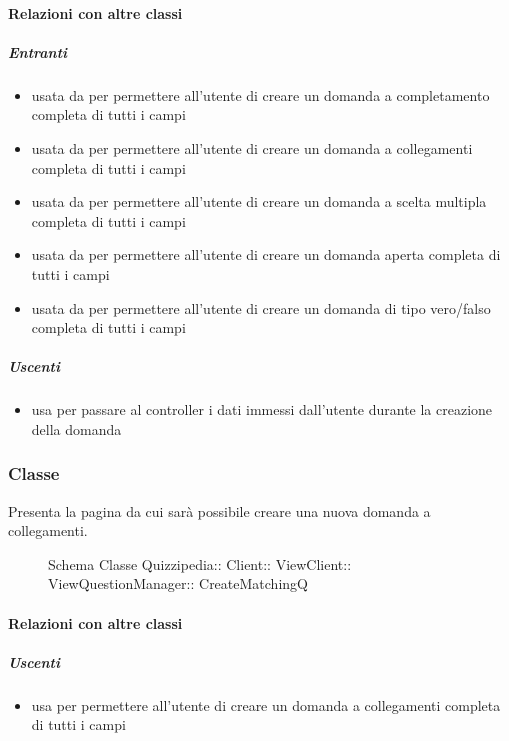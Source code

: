 \paragraph{Relazioni con altre classi}
\subparagraph{Entranti}
\begin{itemize}
\item usata da  per permettere all'utente di creare un domanda a completamento completa di tutti i campi
\item usata da  per permettere all'utente di creare un domanda a collegamenti completa di tutti i campi
\item usata da  per permettere all'utente di creare un domanda a scelta multipla completa di tutti i campi
\item usata da  per permettere all'utente di creare un domanda aperta completa di tutti i campi
\item usata da  per permettere all'utente di creare un domanda di tipo vero/falso completa di tutti i campi
\end{itemize}
\subparagraph{Uscenti}
\begin{itemize}
\item usa  per passare al controller i dati immessi dall'utente durante la creazione della domanda
\end{itemize}
\subsubsection{Classe }
Presenta la pagina da cui sarà possibile creare una nuova domanda a collegamenti.
\begin{figure}[H]
\centering
\noindent{}
\caption[Schema Classe CreateMatchingQ]{Schema Classe Quizzipedia:: Client:: ViewClient:: ViewQuestionManager:: CreateMatchingQ}
\end{figure}
\paragraph{Relazioni con altre classi}
\subparagraph{Uscenti}
\begin{itemize}
\item usa  per permettere all'utente di creare un domanda a collegamenti completa di tutti i campi
\end{itemize}
